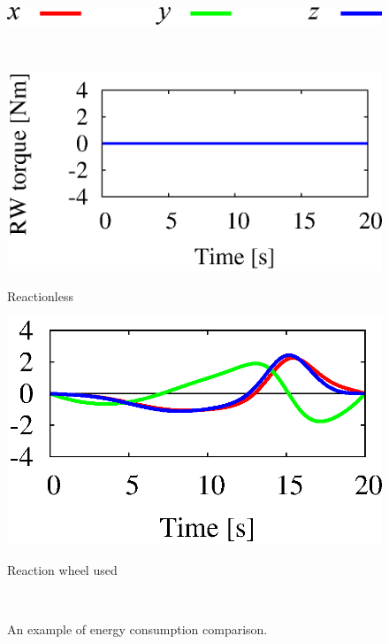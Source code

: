 \begin{figure}[t]
  \vspace{-7mm}
  \centering
  \begin{minipage}[h]{0.350\linewidth}
    \centering
    \includegraphics[width=1.0\linewidth]{fig/chapter5/comparison/torque.eps}
  \end{minipage}\\
  \vspace{-4mm}
  \begin{minipage}[h]{0.40\linewidth}
    \centering
    \includegraphics[width=1.0\linewidth]{fig/chapter5/comparison/RL-M/RNS_U03_reaction_wheel_torque.eps}
    \footnotesize\par{\vspace{-2mm}\hspace{8mm}Reactionless}
  \end{minipage}
  \hspace{-4mm}
  \begin{minipage}[h]{0.40\linewidth}
    \centering
    \includegraphics[width=1.0\linewidth]{fig/chapter5/comparison/RW-M/RNS_U03_reaction_wheel_torque.eps}
    \footnotesize\par{\vspace{-2mm}\hspace{8mm}Reaction wheel used}
  \end{minipage}\\
  \vspace{-4mm}
  \vspace{1em}
  \caption{An example of energy consumption comparison.}
  \label{fig:RES_ENE}
\end{figure}
